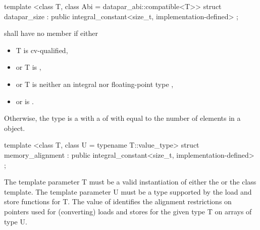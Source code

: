 \begin{itemdecl}
template <class T, class Abi = datapar_abi::compatible<T>>
struct datapar_size : public integral_constant<size_t, implementation-defined> {};
\end{itemdecl}
\begin{itemdescr}
  \pnum\label{datapar_size}%
   shall have no member  if either
  \begin{itemize}
    \item \type T is cv-qualified,
    \item or \type T is \bool,
    \item or \type T is neither an integral nor floating-point type \parencite[(3.9.1)]{N4618},
    \item or  is \false.
  \end{itemize}

  \pnum
  Otherwise, the type  is a \BinaryTypeTrait with a \BaseCharacteristic of  with  equal to the number of elements in a \datapar[<T, Abi>] object.

\end{itemdescr}

\begin{itemdecl}
template <class T, class U = typename T::value_type>
struct memory_alignment : public integral_constant<size_t, implementation-defined> {};
\end{itemdecl}
\begin{itemdescr}
  \pnum\requires The template parameter \type T must be a valid instantiation of either the \datapar or the \mask class template.
  \pnum\requires The template parameter \type U must be a type supported by the load and store functions for \type T.
  \pnum The value of  identifies the alignment restrictions on pointers used for (converting) loads and stores for the given type \type T on arrays of type \type U.
\end{itemdescr}



